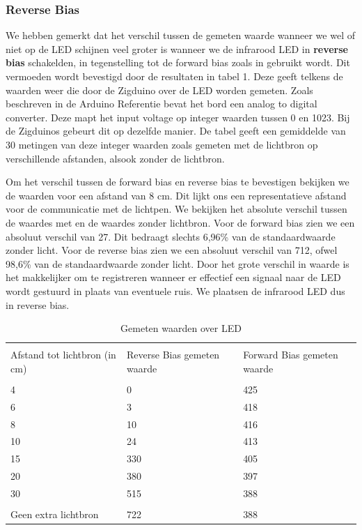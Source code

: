 \documentclass{article}
\begin{document}
\subsubsection{Reverse Bias}
We hebben gemerkt dat het verschil tussen de gemeten waarde wanneer we wel of niet op de LED schijnen veel groter is wanneer we de infrarood LED in \textbf{reverse bias} schakelden, in tegenstelling tot de forward bias zoals in \cite{smartLED} gebruikt wordt. Dit vermoeden wordt bevestigd door de resultaten in tabel 1. Deze geeft telkens de waarden weer die door de Zigduino over de LED worden gemeten. Zoals beschreven in de Arduino Referentie \cite{Arduino} bevat het bord een analog to digital converter. Deze mapt het input voltage op integer waarden tussen 0 en 1023. Bij de Zigduinos gebeurt dit op dezelfde manier. De tabel geeft een gemiddelde van 30 metingen van deze integer waarden zoals gemeten met de lichtbron op verschillende afstanden, alsook zonder de lichtbron. 

Om het verschil tussen de forward bias en reverse bias te bevestigen bekijken we de waarden voor een afstand van 8 cm. Dit lijkt ons een representatieve afstand voor de communicatie met de lichtpen. We bekijken het absolute verschil tussen de waardes met en de waardes zonder lichtbron. 
Voor de forward bias zien we een absoluut verschil van 27. Dit bedraagt slechts 6,96\% van de standaardwaarde zonder licht. 
Voor de reverse bias zien we een absoluut verschil van 712, ofwel 98,6\% van de standaardwaarde zonder licht. 
Door het grote verschil in waarde is het makkelijker om te registreren wanneer er effectief een signaal naar de LED wordt gestuurd in plaats van eventuele ruis. We plaatsen de infrarood LED dus in reverse bias.


\begin{table}
	\centering
    \begin{tabular}{ | p{1.5cm} | p{1.5 cm} | p{1.5 cm} | }
    \hline
    & & \\
    Afstand tot lichtbron (in cm) & Reverse Bias gemeten waarde & Forward Bias gemeten waarde  \\ \hline
    & &  \\
    4 & 0 & 425  \\ 
    6 & 3 & 418   \\ 
    8 & 10 & 416   \\ 
    10 & 24 & 413   \\ 
    15 & 330 & 405   \\ 
    20 & 380 & 397  \\ 
    30 & 515 & 388  \\ \hline
    & & \\ 
    Geen extra lichtbron & 722 & 388   \\ 

    \hline
    \end{tabular}
  \caption{Gemeten waarden over LED} 
\end{table}
\end{document}
